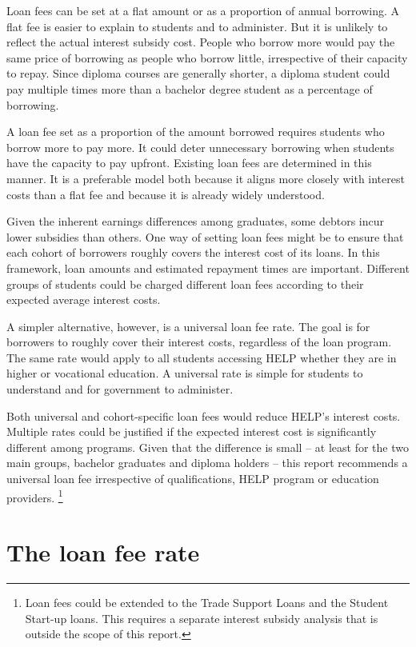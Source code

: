 \documentclass[embargoed]{grattan}
\begin{document}
Loan fees can be set at a flat amount or as a proportion of annual borrowing.
A flat fee is easier to explain to students and to administer.
But it is unlikely to reflect the actual interest subsidy cost.
People who borrow more would pay the same price of borrowing as people who borrow little, irrespective of their capacity to repay.
Since diploma courses are generally shorter, a diploma student could pay multiple times more than a bachelor degree student as a percentage of borrowing.

A loan fee set as a proportion of the amount borrowed requires students who borrow more to pay more.
It could deter unnecessary borrowing when students have the capacity to pay upfront.
Existing loan fees are determined in this manner.
It is a preferable model both because it aligns more closely with interest costs than a flat fee and because it is already widely understood.

Given the inherent earnings differences among graduates, some debtors incur lower subsidies than others.
One way of setting loan fees might be to ensure that each cohort of borrowers roughly covers the interest cost of its loans.
In this framework, loan amounts and estimated repayment times are important.
Different groups of students could be charged different loan fees according to their expected average interest costs.

A simpler alternative, however, is a universal loan fee rate.
The goal is for borrowers to roughly cover their interest costs, regardless of the loan program.
The same rate would apply to all students accessing \gls{HELP} whether they are in higher or vocational education.
A universal rate is simple for students to understand and for government to administer.

Both universal and cohort-specific loan fees would reduce \gls{HELP}'s interest costs.
Multiple rates could be justified if the expected interest cost is significantly different among programs.
Given that the difference is small -- at least for the two main groups, bachelor graduates and diploma holders -- this report recommends a universal loan fee irrespective of qualifications, \gls{HELP} program or education providers.%
\footnote{Loan fees could be extended to the Trade Support Loans and the Student Start-up loans.
This requires a separate interest subsidy analysis that is outside the scope of this report.}

\section{The loan fee rate}\label{sec:the-loan-fee-rate}
\end{document}
